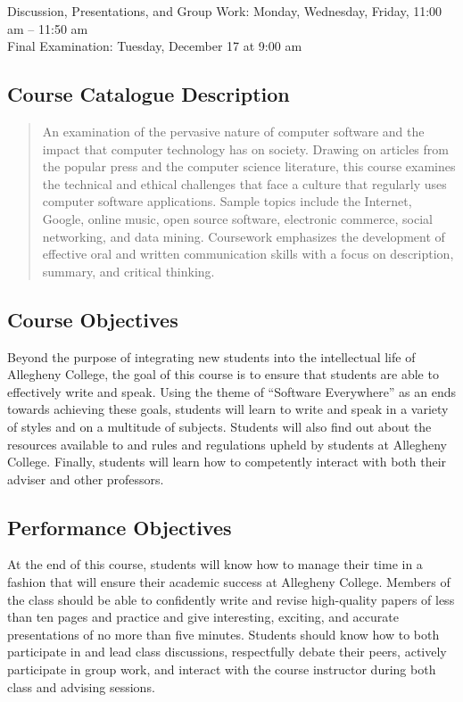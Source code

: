 Discussion, Presentations, and Group Work: Monday, Wednesday, Friday, 11:00 am -- 11:50 am \\
Final Examination: Tuesday, December 17 at 9:00 am

\subsection*{Course Catalogue Description}

\begin{quote}

An examination of the pervasive nature of computer software and the impact that computer technology has on society.
Drawing on articles from the popular press and the computer science literature, this course examines the technical and
ethical challenges that face a culture that regularly uses computer software applications. Sample topics include the
Internet, Google, online music, open source software, electronic commerce, social networking, and data mining.
Coursework emphasizes the development of effective oral and written communication skills with a focus on description,
summary, and critical thinking.

\end{quote}

\subsection*{Course Objectives}

Beyond the purpose of integrating new students into the intellectual life of Allegheny College, the goal of this course
is to ensure that students are able to effectively write and speak.  Using the theme of ``Software Everywhere'' as an
ends towards achieving these goals, students will learn to write and speak in a variety of styles and on a multitude of
subjects.  Students will also find out about the resources available to and rules and regulations upheld by students at 
Allegheny College.  Finally, students will learn how to competently interact with both their adviser and other
professors.

\subsection*{Performance Objectives}

At the end of this course, students will know how to manage their time in a fashion that will ensure their academic
success at Allegheny College.  Members of the class should be able to confidently write and revise high-quality papers
of less than ten pages and practice and give interesting, exciting, and accurate presentations of no more than five
minutes.  Students should know how to both participate in and lead class discussions, respectfully debate their peers,
actively participate in group work, and interact with the course instructor during both class and advising sessions. 

